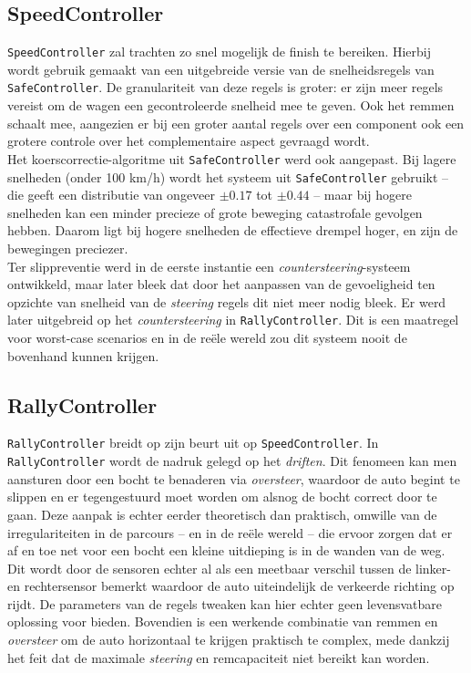 \documentclass[10pt,a4paper]{article}
\begin{document}
		\subsection{SpeedController}
			\texttt{SpeedController} zal trachten zo snel mogelijk de finish te bereiken. Hierbij wordt gebruik gemaakt van een uitgebreide versie van de snelheidsregels van \texttt{SafeController}. De granulariteit van deze regels is groter: er zijn meer regels vereist om de wagen een gecontroleerde snelheid mee te geven. Ook het remmen schaalt mee, aangezien er bij een groter aantal regels over een component ook een grotere controle over het complementaire aspect gevraagd wordt.\\

			Het koerscorrectie-algoritme uit \texttt{SafeController} werd ook aangepast. Bij lagere snelheden (onder 100 km/h) wordt het systeem uit \texttt{SafeController} gebruikt -- die geeft een distributie van ongeveer $\pm 0.17$ tot $\pm 0.44$ -- maar bij hogere snelheden kan een minder precieze of grote beweging catastrofale gevolgen hebben. Daarom ligt bij hogere snelheden de effectieve drempel hoger, en zijn de bewegingen preciezer.\\

			Ter slippreventie werd in de eerste instantie een \textit{countersteering}-systeem ontwikkeld, maar later bleek dat door het aanpassen van de gevoeligheid ten opzichte van snelheid van de \textit{steering} regels dit niet meer nodig bleek. Er werd later uitgebreid op het \textit{countersteering} in \texttt{RallyController}. Dit is een maatregel voor worst-case scenarios en in de re\"ele wereld zou dit systeem nooit de bovenhand kunnen krijgen.\\

		\subsection{RallyController}
			\texttt{RallyController} breidt op zijn beurt uit op \texttt{SpeedController}. In \texttt{RallyController} wordt de nadruk gelegd op het \textit{driften}. Dit fenomeen kan men aansturen door een bocht te benaderen via \textit{oversteer}, waardoor de auto begint te slippen en er tegengestuurd moet worden om alsnog de bocht correct door te gaan. Deze aanpak is echter eerder theoretisch dan praktisch, omwille van de irregulariteiten in de parcours -- en in de re\"ele wereld -- die ervoor zorgen dat er af en toe net voor een bocht een kleine uitdieping is in de wanden van de weg. Dit wordt door de sensoren echter al als een meetbaar verschil tussen de linker- en rechtersensor bemerkt waardoor de auto uiteindelijk de verkeerde richting op rijdt. De parameters van de regels tweaken kan hier echter geen levensvatbare oplossing voor bieden. Bovendien is een werkende combinatie van remmen en \textit{oversteer} om de auto horizontaal te krijgen praktisch te complex, mede dankzij het feit dat de maximale \textit{steering} en remcapaciteit niet bereikt kan worden.\\
\end{document}
